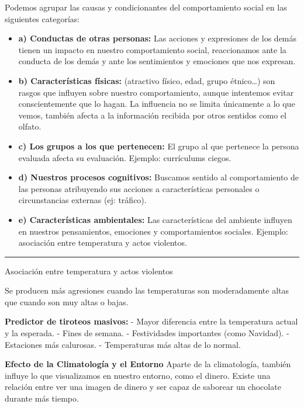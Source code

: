 \documentclass[
]{website}
\providecommand{\tightlist}{%
  \setlength{\itemsep}{0pt}\setlength{\parskip}{0pt}}
\begin{document}
Podemos agrupar las causas y condicionantes del comportamiento social en las siguientes categorías:

\begin{itemize}
\tightlist
\item
  \textbf{a) Conductas de otras personas:} Las acciones y expresiones de los demás tienen un impacto en nuestro comportamiento social, reaccionamos ante la conducta de los demás y ante los sentimientos y emociones que nos expresan.
\item
  \textbf{b) Características físicas:} (atractivo físico, edad, grupo étnico\ldots) son rasgos que influyen sobre nuestro comportamiento, aunque intentemos evitar conscientemente que lo hagan. La influencia no se limita únicamente a lo que vemos, también afecta a la información recibida por otros sentidos como el olfato.
\item
  \textbf{c) Los grupos a los que pertenecen:} El grupo al que pertenece la persona evaluada afecta su evaluación. Ejemplo: currículums ciegos.
\item
  \textbf{d) Nuestros procesos cognitivos:} Buscamos sentido al comportamiento de las personas atribuyendo sus acciones a características personales o circunstancias externas (ej: tráfico).
\item
  \textbf{e) Características ambientales:} Las características del ambiente influyen en nuestros pensamientos, emociones y comportamientos sociales. Ejemplo: asociación entre temperatura y actos violentos.
\end{itemize}

\begin{center}\rule{0.5\linewidth}{0.5pt}\end{center}

Asociación entre temperatura y actos violentos

Se producen más agresiones cuando las temperaturas son moderadamente altas que cuando son muy altas o bajas.

\textbf{Predictor de tiroteos masivos:}
- Mayor diferencia entre la temperatura actual y la esperada.
- Fines de semana.
- Festividades importantes (como Navidad).
- Estaciones más calurosas.
- Temperaturas más altas de lo normal.

\textbf{Efecto de la Climatología y el Entorno}
Aparte de la climatología, también influye lo que visualizamos en nuestro entorno, como el dinero. Existe una relación entre ver una imagen de dinero y ser capaz de saborear un chocolate durante más tiempo.
\end{document}
